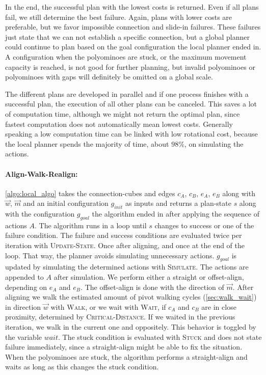 In the end, the successful plan with the lowest costs is returned.
Even if all plans fail, we still determine the best failure.
Again, plans with lower costs are preferable, but we favor impossible connection and slide-in failures.
These failures just state that we can not establish a specific connection, but a global planner could continue to plan based on the goal configuration the local planner ended in.
A configuration when the polyominoes are stuck, or the maximum movement capacity is reached, is not good for further planning, but invalid polyominoes or polyominoes with gaps will definitely be omitted on a global scale.

The different plans are developed in parallel and if one process finishes with a successful plan, the execution of all other plans can be canceled.
This saves a lot of computation time, although we might not return the optimal plan, since fastest computation does not automatically mean lowest costs.
Generally speaking a low computation time can be linked with low rotational cost, because the local planner spends the majority of time, about $98\%$, on simulating the actions.

\paragraph{Align-Walk-Realign:}

\autoref{algo:local_algo} takes the connection-cubes and edges $c_A$, $c_B$, $e_A$, $e_B$ along with $\vec{w}$, $\vec{m}$ and an initial configuration $g_{init}$ as inputs and returns a plan-state $s$ along with the configuration $g_{goal}$ the algorithm ended in after applying the sequence of actions $A$.
The algorithm runs in a loop until $s$ changes to success or one of the failure condition.
The failure and success conditions are evaluated twice per iteration with {\scshape Update-State}.
Once after aligning, and once at the end of the loop.
That way, the planner avoids simulating unnecessary actions.
$g_{goal}$ is updated by simulating the determined actions with {\scshape Simulate}.
The actions are appended to $A$ after simulation.
We perform either a straight or offset-align, depending on $e_A$ and $e_B$.
The offset-align is done with the direction of $\vec{m}$.
After aligning we walk the estimated amount of pivot walking cycles (\autoref{sec:walk_wait}) in direction $\vec{w}$ with {\scshape Walk}, or we wait with {\scshape Wait}, if $c_A$ and $c_B$ are in close proximity, determined by {\scshape Critical-Distance}.
If we waited in the previous iteration, we walk in the current one and oppositely.
This behavior is toggled by the variable $wait$. 
The stuck condition is evaluated with {\scshape Stuck} and does not state failure immediately, since a straight-align might be able to fix the situation.
When the polyominoes are stuck, the algorithm performs a straight-align and waits as long as this changes the stuck condition.







